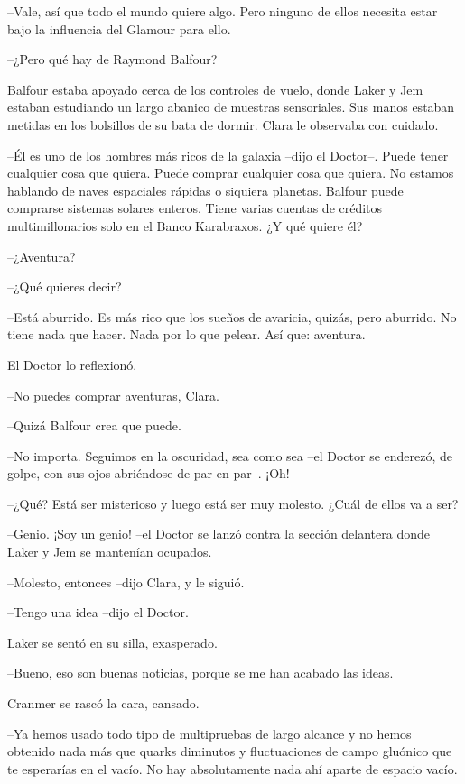 {--Vale, así que todo el mundo quiere algo. Pero ninguno de ellos
necesita estar bajo la influencia del Glamour para ello.}

{--¿Pero qué hay de Raymond Balfour?}

{Balfour estaba apoyado cerca de los controles de vuelo, donde Laker y
 Jem estaban estudiando un largo abanico de muestras sensoriales. Sus
 manos estaban metidas en los bolsillos de su bata de dormir. Clara le
observaba con cuidado.}

{--Él es uno de los hombres más ricos de la galaxia --dijo el Doctor--.
 Puede tener cualquier cosa que quiera. Puede comprar cualquier cosa que
 quiera. No estamos hablando de naves espaciales rápidas o siquiera
 planetas. Balfour puede comprarse sistemas solares enteros. Tiene varias
 cuentas de créditos multimillonarios solo en el Banco Karabraxos. ¿Y qué
quiere él?}

{--¿Aventura?}

{--¿Qué quieres decir?}

{--Está aburrido. Es más rico que los sueños de avaricia, quizás, pero
 aburrido. No tiene nada que hacer. Nada por lo que pelear. Así que:
aventura.}

{El Doctor lo reflexionó.}

{--No puedes comprar aventuras, Clara.}

{--Quizá Balfour crea que puede.}

{--No importa. Seguimos en la oscuridad, sea como sea --el Doctor se
enderezó, de golpe, con sus ojos abriéndose de par en par--. ¡Oh!}

{--¿Qué? Está ser misterioso y luego está ser muy molesto. ¿Cuál de ellos
va a ser?}

{--Genio. ¡Soy un genio! --el Doctor se lanzó contra la sección delantera
donde Laker y Jem se mantenían ocupados.}

{--Molesto, entonces --dijo Clara, y le siguió.}

{--Tengo una idea --dijo el Doctor.}

{Laker se sentó en su silla, exasperado.}

{--Bueno, eso son buenas noticias, porque se me han acabado las ideas.}

{Cranmer se rascó la cara, cansado.}

{--Ya hemos usado todo tipo de multipruebas de largo alcance y no hemos
 obtenido nada más que quarks diminutos y fluctuaciones de campo gluónico
 que te esperarías en el vacío. No hay absolutamente nada ahí aparte de
espacio vacío.}


